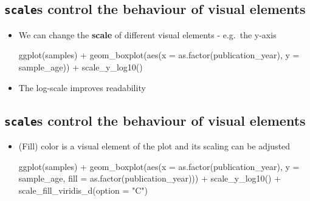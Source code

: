\documentclass[
  letterpaper,
]{book}
\newenvironment{Shaded}{}{}
\newcommand{\AttributeTok}[1]{\textcolor[rgb]{0.84,0.23,0.29}{#1}}
\newcommand{\FunctionTok}[1]{\textcolor[rgb]{0.44,0.26,0.76}{#1}}
\newcommand{\NormalTok}[1]{\textcolor[rgb]{0.14,0.16,0.18}{#1}}
\newcommand{\SpecialCharTok}[1]{\textcolor[rgb]{0.00,0.36,0.77}{#1}}
\newcommand{\StringTok}[1]{\textcolor[rgb]{0.01,0.18,0.38}{#1}}
\begin{document}
\hypertarget{scales-control-the-behaviour-of-visual-elements-1}{%
\subsection{\texorpdfstring{\texttt{scale}s control the behaviour of
visual
elements}{scales control the behaviour of visual elements}}\label{scales-control-the-behaviour-of-visual-elements-1}}

\begin{itemize}
\item
  We can change the \textbf{scale} of different visual elements -
  e.g.~the y-axis

\begin{Shaded}
\begin{Highlighting}[]
\FunctionTok{ggplot}\NormalTok{(samples) }\SpecialCharTok{+}
\FunctionTok{geom\_boxplot}\NormalTok{(}\FunctionTok{aes}\NormalTok{(}\AttributeTok{x =} \FunctionTok{as.factor}\NormalTok{(publication\_year), }\AttributeTok{y =}\NormalTok{ sample\_age)) }\SpecialCharTok{+}
\FunctionTok{scale\_y\_log10}\NormalTok{()}
\end{Highlighting}
\end{Shaded}
\item
  The log-scale improves readability
\end{itemize}

\hypertarget{scales-control-the-behaviour-of-visual-elements-2}{%
\subsection{\texorpdfstring{\texttt{scale}s control the behaviour of
visual
elements}{scales control the behaviour of visual elements}}\label{scales-control-the-behaviour-of-visual-elements-2}}

\begin{itemize}
\item
  (Fill) color is a visual element of the plot and its scaling can be
  adjusted

\begin{Shaded}
\begin{Highlighting}[]
\FunctionTok{ggplot}\NormalTok{(samples) }\SpecialCharTok{+}
\FunctionTok{geom\_boxplot}\NormalTok{(}\FunctionTok{aes}\NormalTok{(}\AttributeTok{x =} \FunctionTok{as.factor}\NormalTok{(publication\_year), }\AttributeTok{y =}\NormalTok{ sample\_age,}
                \AttributeTok{fill =} \FunctionTok{as.factor}\NormalTok{(publication\_year))) }\SpecialCharTok{+}
\FunctionTok{scale\_y\_log10}\NormalTok{() }\SpecialCharTok{+} \FunctionTok{scale\_fill\_viridis\_d}\NormalTok{(}\AttributeTok{option =} \StringTok{"C"}\NormalTok{)}
\end{Highlighting}
\end{Shaded}
\end{itemize}
\end{document}
